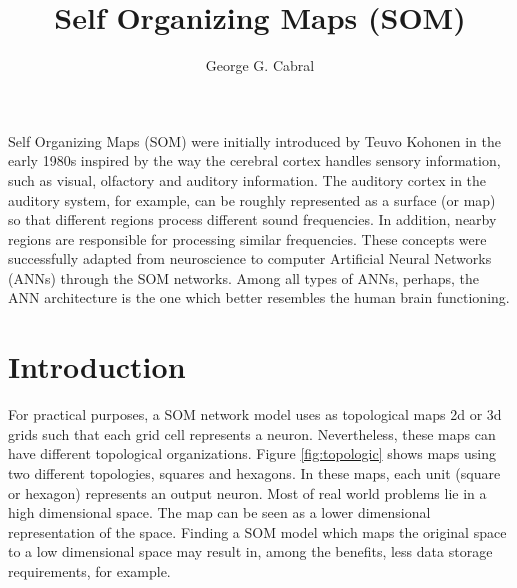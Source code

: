 \title{Self Organizing Maps (SOM)}
\label{chp:self-organizing-maps}
\author{George G. Cabral}




\maketitle



Self Organizing Maps (SOM) were initially introduced by Teuvo Kohonen \cite{kohonen:1982,khonen:1990} in the early 1980s inspired by the way the cerebral cortex handles sensory information, such as visual, olfactory and auditory information. The auditory cortex in the auditory system, for example, can be roughly represented as a surface (or map) so that different regions process different sound frequencies. In addition, nearby regions are responsible for processing similar frequencies. These concepts were successfully adapted from neuroscience to computer Artificial Neural Networks (ANNs) through the SOM networks. Among all types of ANNs, perhaps, the ANN architecture is the one which better resembles the human brain functioning.

\section{Introduction}

For practical purposes, a SOM network model uses as topological maps 2d or 3d grids such that each grid cell represents a neuron. Nevertheless, these maps can have different topological organizations. Figure \ref{fig:topologic} shows maps using two different topologies, squares and hexagons. In these maps, each unit (square or hexagon) represents an output neuron. %
 Most of real world problems lie in a high dimensional space. The map can be seen as a lower dimensional representation of the space. Finding a SOM model which maps the original space to a low dimensional space may result in, among the benefits, less data storage requirements, for example.

